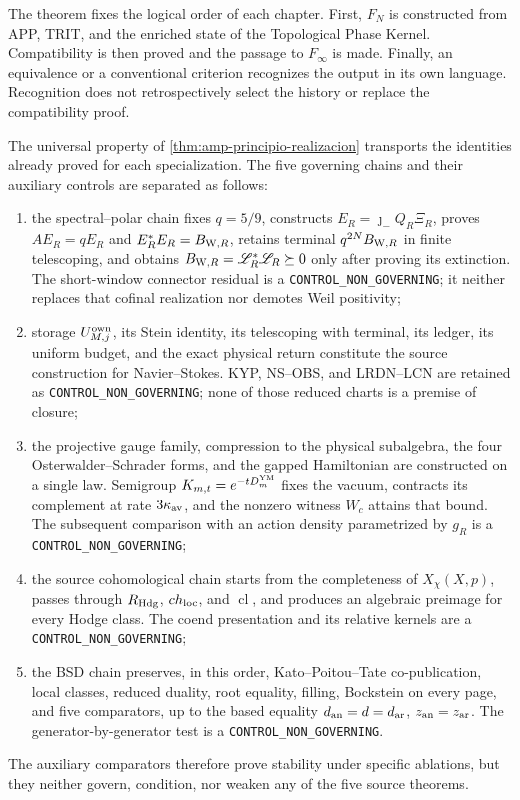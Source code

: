 The theorem fixes the logical order of each chapter. First, \(F_N\) is constructed from APP, TRIT, and the enriched state of the Topological Phase Kernel. Compatibility is then proved and the passage to \(F_\infty\) is made. Finally, an equivalence or a conventional criterion recognizes the output in its own language. Recognition does not retrospectively select the history or replace the compatibility proof.

\begin{proposition}
\label{prop:amp-alcance-cinco-realizadores}
The universal property of \cref{thm:amp-principio-realizacion} transports the identities already proved for each specialization. The five governing chains and their auxiliary controls are separated as follows:
\begin{enumerate}
 \item the spectral--polar chain fixes \(q=5/9\), constructs \(E_R=\jmath_-Q_R\Xi_R\), proves \(AE_R=qE_R\) and \(E_R^*E_R=\mathcal B_{{\rm W},R}\), retains terminal \(q^{2N}\mathcal B_{{\rm W},R}\) in finite telescoping, and obtains \(\mathcal B_{{\rm W},R}=\mathscr L_R^*\mathscr L_R\succeq0\) only after proving its extinction. The short-window connector residual is a \texttt{CONTROL\_NON\_GOVERNING}; it neither replaces that cofinal realization nor demotes Weil positivity;
 \item storage \(U_{M,j}^{\rm own}\), its Stein identity, its telescoping with terminal, its ledger, its uniform budget, and the exact physical return constitute the source construction for Navier--Stokes. KYP, NS--OBS, and LRDN--LCN are retained as \texttt{CONTROL\_NON\_GOVERNING}; none of those reduced charts is a premise of closure;
 \item the projective gauge family, compression to the physical subalgebra, the four Osterwalder--Schrader forms, and the gapped Hamiltonian are constructed on a single law. Semigroup \(K_{m,t}=e^{-tD_m^{\rm YM}}\) fixes the vacuum, contracts its complement at rate \(3\kappa_{\rm av}\), and the nonzero witness \(W_c\) attains that bound. The subsequent comparison with an action density parametrized by \(g_R\) is a \texttt{CONTROL\_NON\_GOVERNING};
 \item the source cohomological chain starts from the completeness of \(X_\chi(X,p)\), passes through \(R_{\rm Hdg}\), \(\operatorname{ch}_{\rm loc}\), and \(\operatorname{cl}\), and produces an algebraic preimage for every Hodge class. The coend presentation and its relative kernels are a \texttt{CONTROL\_NON\_GOVERNING};
 \item the BSD chain preserves, in this order, Kato--Poitou--Tate co-publication, local classes, reduced duality, root equality, filling, Bockstein on every page, and five comparators, up to the based equality \(d_{\rm an}=d=d_{\rm ar}\), \(z_{\rm an}=z_{\rm ar}\). The generator-by-generator test is a \texttt{CONTROL\_NON\_GOVERNING}.
\end{enumerate}
The auxiliary comparators therefore prove stability under specific ablations, but they neither govern, condition, nor weaken any of the five source theorems.
\end{proposition}

